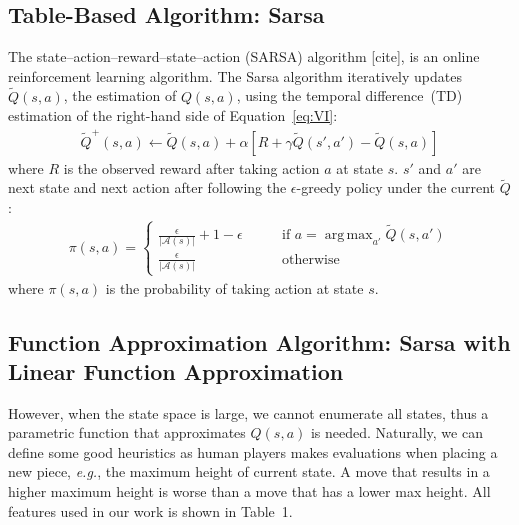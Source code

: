 \documentclass{article}
\DeclareMathOperator*{\argmax}{arg\,max}
\begin{document}
\subsection{Table-Based Algorithm: Sarsa}
The state–action–reward–state–action (SARSA) algorithm [cite], is an online reinforcement learning algorithm. The Sarsa algorithm iteratively updates $\tilde{Q}(s,a)$, the estimation of $Q(s,a)$,  using the temporal difference~(TD) estimation of the right-hand side of Equation~\eqref{eq:VI}:
\begin{align}
	\label{eq:sarsa}
	\tilde{Q}^+(s,a)\leftarrow \tilde{Q}(s,a)+\alpha\left[R+\gamma \tilde{Q}(s',a')-\tilde{Q}(s,a)\right]
\end{align}
where $R$ is the observed reward after taking action $a$ at state $s$. $s'$ and $a'$ are next state and next action after following the $\epsilon$-greedy policy under the current $\tilde{Q}$:
\begin{align}
	\pi(s,a)=\begin{cases}
		\frac{\epsilon}{|\mathcal{A}(s)|}+1-\epsilon\qquad & \text{if $a=\argmax_{a'} \tilde{Q}(s,a')$} \\
		\frac{\epsilon}{|\mathcal{A}(s)|}\qquad & \text{otherwise}
		\end{cases}
\end{align}
where $\pi(s,a)$ is the probability of taking action at state $s$.
\subsection{Function Approximation Algorithm: Sarsa with Linear Function Approximation}
However, when the state space is large, we cannot enumerate all states, thus a parametric function that approximates $Q(s,a)$ is needed. Naturally, we can define some good heuristics as human players makes evaluations when placing a new piece, \textit{e.g.}, the maximum height of current state. A move that results in a higher maximum height is worse than a move that has a lower max height. All features used in our work is shown in Table~1.
\end{document}
